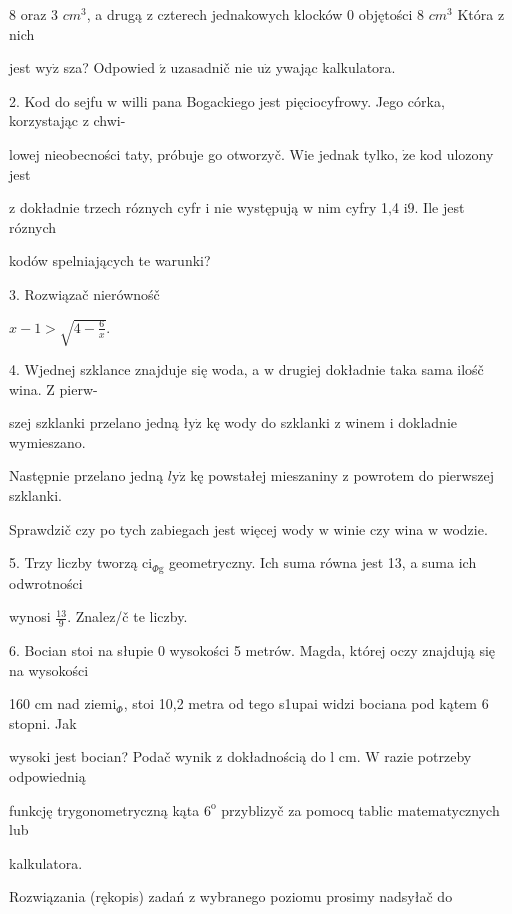 \documentclass[a4paper,12pt]{article}
\begin{document}
8 oraz 3 $cm^{3}$, a drugą $\mathrm{z}$ czterech jednakowych klocków $0$ objętości 8 $cm^{3}$ Która $\mathrm{z}$ nich

jest $\mathrm{w}\mathrm{y}\dot{\mathrm{z}}$ sza? Odpowied $\acute{\mathrm{z}}$ uzasadnič nie $\mathrm{u}\dot{\mathrm{z}}$ ywając kalkulatora.

2. Kod do sejfu $\mathrm{w}$ willi pana Bogackiego jest pięciocyfrowy. Jego córka, korzystając $\mathrm{z}$ chwi-

lowej nieobecności taty, próbuje go otworzyč. Wie jednak tylko, $\dot{\mathrm{z}}\mathrm{e}$ kod ulozony jest

$\mathrm{z}$ dokładnie trzech róznych cyfr $\mathrm{i}$ nie występują $\mathrm{w}$ nim cyfry 1,4 $\mathrm{i}9$. Ile jest róznych

kodów spelniających te warunki?

3. Rozwiązač nierównośč

$x-1>\sqrt{4-\frac{6}{x}}.$

4. Wjednej szklance znajduje się woda, a $\mathrm{w}$ drugiej dokładnie taka sama ilośč wina. $\mathrm{Z}$ pierw-

szej szklanki przelano jedną $\text{ł} \mathrm{y}\dot{\mathrm{z}}$ kę wody do szklanki $\mathrm{z}$ winem $\mathrm{i}$ dokladnie wymieszano.

Następnie przelano jedną $l\mathrm{y}\dot{\mathrm{z}}$ kę powstałej mieszaniny $\mathrm{z}$ powrotem do pierwszej szklanki.

Sprawdzič czy po tych zabiegach jest więcej wody $\mathrm{w}$ winie czy wina $\mathrm{w}$ wodzie.

5. Trzy liczby tworzą $\mathrm{c}\mathrm{i}_{\Phi \mathrm{g}}$ geometryczny. Ich suma równa jest 13, a suma ich odwrotności

wynosi $\displaystyle \frac{13}{9}$. Znalez/č te liczby.

6. Bocian stoi na słupie $0$ wysokości 5 metrów. Magda, której oczy znajdują się na wysokości

160 cm nad $\mathrm{z}\mathrm{i}\mathrm{e}\mathrm{m}\mathrm{i}_{\Phi}$, stoi 10,2 metra od tego s1upai widzi bociana pod kątem 6 stopni. Jak

wysoki jest bocian? Podač wynik $\mathrm{z}$ dokładnością do l cm. $\mathrm{W}$ razie potrzeby odpowiednią

funkcję trygonometryczną kąta $6^{\mathrm{o}}$ przyblizyč za pomocq tablic matematycznych lub

kalkulatora.

Rozwiązania (rękopis) zadań z wybranego poziomu prosimy nadsyłač do
\end{document}
